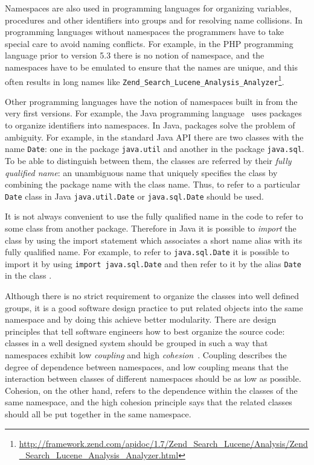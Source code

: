 Namespaces are also used in programming languages for organizing
variables, procedures and other identifiers into groups and
for resolving name collisions. In programming languages without
namespaces the programmers have to take special care to avoid
naming conflicts. For example, in the PHP programming language
prior to version 5.3 \cite{mcarthur2008php6} there is no notion of namespace, and
the namespaces have to be emulated to ensure that the names
are unique, and this often results in long names like
\verb|Zend_Search_Lucene_Analysis_Analyzer|\footnote{\url{http://framework.zend.com/apidoc/1.7/Zend_Search_Lucene/Analysis/Zend_Search_Lucene_Analysis_Analyzer.html}}.


Other programming languages have the notion of namespaces built in
from the very first versions. For example, the Java programming
language~\cite{gosling2014java} uses packages to organize identifiers into
namespaces. In Java, packages solve the problem of ambiguity. For example,
in the standard Java API there are two classes with the name \texttt{Date}:
one in the package \texttt{java.util} and another in the package \texttt{java.sql}.
To be able to distinguish between them, the classes are referred by their
\emph{fully qualified name}: an unambiguous name that uniquely specifies the class
by combining the package name with the class name. Thus, to refer to a particular
\texttt{Date} class in Java  \texttt{java.util.Date} or  \texttt{java.sql.Date}
should be used.

It is not always convenient to use the fully qualified name in the code to
refer to some class from another package. Therefore in Java it is possible to
\emph{import} the class by using the import statement which associates
a short name alias with its fully qualified name.
For example, to refer to \texttt{java.sql.Date} it is possible to import
it by using \texttt{import java.sql.Date} and then refer to it by the alias
\texttt{Date} in the class \cite{gosling2014java}.


Although there is no strict requirement to organize the classes into
well defined groups, it is a good software design practice to put
related objects into the same namespace and by doing this achieve
better modularity. There are design principles that tell software engineers
how to best organize the source code: classes in a well designed system
should be grouped in such a way that namespaces
exhibit low \emph{coupling} and high \emph{cohesion}~\cite{larman2005applying}.
Coupling describes the degree of dependence between namespaces, and
low coupling means that the interaction between classes of different
namespaces should be as low as possible. Cohesion, on the other hand,
refers to the dependence within the classes of the same namespace,
and the high cohesion principle says that the related classes
should all be put together in the same namespace.

